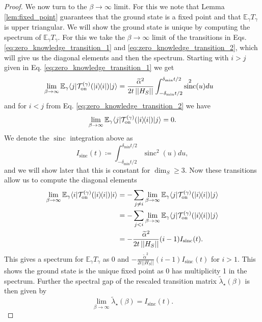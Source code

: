 \documentclass[
 amsmath,amssymb,
 aps,
onecolumn, 
nofootinbib]{revtex4-2}
\newcommand{\on}{\rm on}
\newcommand{\ket}[1]{|#1\rangle}
\newcommand{\bra}[1]{\langle #1|}
\newcommand{\ketbra}[2]{| #1\rangle\! \langle #2|}
\newcommand{\norm}[1]{\left|\left| #1 \right|\right|}
\newcommand{\EE}{\mathbb{E}}
\newcommand{\TT}{\mathcal{T}}
\DeclareMathOperator{\sinc}{sinc}
\begin{document}
\begin{proof}
    We now turn to the $\beta \to \infty$ limit. For this we note that Lemma \ref{lem:fixed_point} guarantees that the ground state is a fixed point and that $\EE_\gamma T_\gamma$ is upper triangular. We will show the ground state is unique by computing the spectrum of $\EE_\gamma T_\gamma$. For this we take the $\beta \to \infty$ limit of the transitions in Eqs. \eqref{eq:zero_knowledge_transition_1} and \eqref{eq:zero_knowledge_transition_2}, which will give us the diagonal elements and then the spectrum. Starting with $i > j$ given in Eq. \eqref{eq:zero_knowledge_transition_1} we get
    \begin{align}
        \lim_{\beta \to \infty} \EE_\gamma \bra{j} \TT_{\on}^{(\gamma)}(\ketbra{i}{i})\ket{j} &= \frac{\widetilde{\alpha}^2}{2 t \norm{H_S}} \int_{-\delta_{\min}t/2}^{\delta_{\min}t/2} \sinc^2(u) du
    \end{align}
    and for $i < j$ from Eq. \eqref{eq:zero_knowledge_transition_2} we have
    \begin{equation}
        \lim_{\beta \to \infty} \EE_\gamma \bra{j} \TT_{\on}^{(\gamma)}(\ketbra{i}{i})\ket{j} = 0.
    \end{equation}
    We denote the $\sinc$ integration above as
    \begin{equation}
        I_{\sinc}(t) \coloneqq \int_{-\delta_{\min}t/2}^{\delta_{\min} t/2} \sinc^2(u) du,
    \end{equation}
    and we will show later that this is constant for $\dim_S \ge 3$. Now these transitions allow us to compute the diagonal elements
    \begin{align}
        \lim_{\beta \to \infty} \EE_\gamma \bra{i} \TT_{\on}^{(\gamma)}(\ketbra{i}{i}) \ket{i} &= - \sum_{j \neq i} \lim_{\beta \to \infty} \EE_\gamma \bra{j} \TT_{\on}^{(\gamma)}(\ketbra{i}{i}) \ket{j} \\
        &= - \sum_{j < i} \lim_{\beta \to \infty} \EE_\gamma \bra{j} \TT_{\on}^{(\gamma)}(\ketbra{i}{i}) \ket{j} \\
        &= - \frac{\widetilde{\alpha}^2}{2 t \norm{H_S}} (i - 1) I_{\sinc}(t).
    \end{align}
    This gives a spectrum for $\EE_\gamma T_\gamma$ as 0 and $- \frac{\widetilde{\alpha}^2}{2 t \norm{H_S}} (i - 1) I_{\sinc}(t)$ for $i > 1$. This shows the ground state is the unique fixed point as 0 has multiplicity 1 in the spectrum. Further the spectral gap of the rescaled transition matrix $\widetilde{\lambda}_\star(\beta)$ is then given by
    \begin{equation}
        \lim_{\beta \to \infty} \widetilde{\lambda}_\star(\beta) = I_{\sinc}(t).

\end{equation}
\end{proof}
\end{document}
